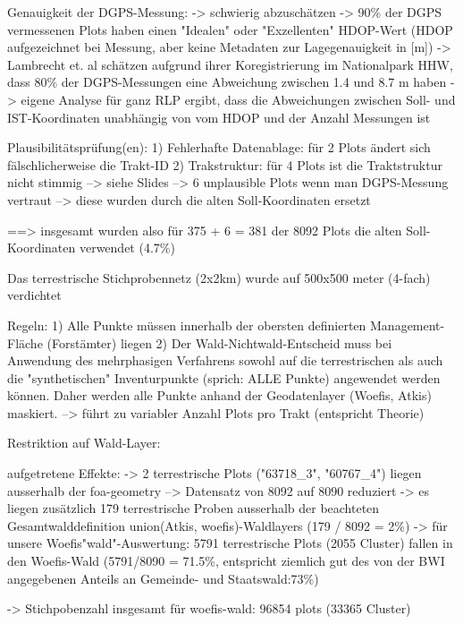 Genauigkeit der DGPS-Messung:  
-> schwierig abzuschätzen
->  90\% der DGPS vermessenen Plots haben einen "Idealen" oder "Exzellenten" HDOP-Wert (HDOP aufgezeichnet
    bei Messung, aber keine Metadaten zur Lagegenauigkeit in [m])
-> Lambrecht et. al schätzen aufgrund ihrer Koregistrierung im Nationalpark HHW, dass 80\% der DGPS-Messungen 
   eine Abweichung zwischen 1.4 und 8.7 m haben
-> eigene Analyse für ganz RLP ergibt, dass die Abweichungen zwischen Soll- und IST-Koordinaten unabhängig von
   vom HDOP und der Anzahl Messungen ist

Plausibilitätsprüfung(en):
1) Fehlerhafte Datenablage: für 2 Plots ändert sich fälschlicherweise die Trakt-ID
2) Trakstruktur: für 4 Plots ist die Traktstruktur nicht stimmig --> siehe Slides
 --> 6 unplausible Plots wenn man DGPS-Messung vertraut --> diese wurden durch die alten Soll-Koordinaten ersetzt
 
 
==> insgesamt wurden also für 375 + 6 = 381 der 8092 Plots die alten Soll-Koordinaten verwendet (4.7\%)



Das terrestrische Stichprobennetz (2x2km) wurde auf 500x500 meter (4-fach) verdichtet

Regeln:
1) Alle Punkte müssen innerhalb der obersten definierten Management-Fläche (Forstämter) liegen
2) Der Wald-Nichtwald-Entscheid muss bei Anwendung des mehrphasigen Verfahrens sowohl auf die terrestrischen als auch
   die "synthetischen" Inventurpunkte (sprich: ALLE Punkte) angewendet werden können. Daher werden alle Punkte anhand der
   Geodatenlayer (Woefis, Atkis) maskiert. --> führt zu variabler Anzahl Plots pro Trakt (entspricht Theorie)

Restriktion auf Wald-Layer:

aufgetretene Effekte:
 -> 2 terrestrische Plots ("63718_3", "60767_4") liegen ausserhalb der foa-geometry --> Datensatz von 8092 auf 8090 reduziert
 -> es liegen zusätzlich 179 terrestrische Proben ausserhalb der beachteten Gesamtwalddefinition union(Atkis, woefis)-Waldlayers 
    (179 / 8092 = 2\%)
 -> für unsere Woefis"wald"-Auswertung: 5791 terrestrische Plots (2055 Cluster) fallen in den Woefis-Wald (5791/8090 = 71.5\%, entspricht ziemlich gut des von der BWI angegebenen Anteils an Gemeinde- und Staatswald:73\%) 
 
 -> Stichpobenzahl insgesamt für woefis-wald: 96854 plots (33365 Cluster)
    



